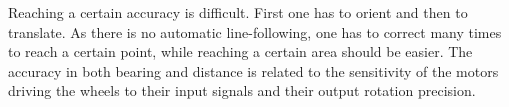 Reaching a certain accuracy is difficult. First one has to
orient and then to translate. As there is no automatic line-following, one
has to correct many times to reach a certain point, while reaching a certain
area should be easier. The accuracy in both bearing and distance is related
to the sensitivity of the motors driving the wheels to their input signals and
their output rotation precision.

